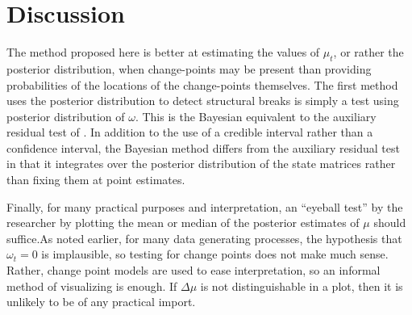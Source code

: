 \section{Discussion}
\label{dlm:sec:ident-change-points}

The method proposed here is better at estimating the values of $\mu_{t}$, or rather the posterior distribution, when change-points may be present than providing probabilities of the locations of the change-points themselves.
The first method uses the posterior distribution to detect structural breaks is simply a test using posterior distribution of $\omega$.
This is the Bayesian equivalent to the auxiliary residual test of \textcite{DeJongPenzer1998}.
In addition to the use of a credible interval rather than a confidence interval, the Bayesian method differs from the auxiliary residual test in that it integrates over the posterior distribution of the state matrices rather than fixing them at point estimates.




Finally, for many practical purposes and interpretation, an ``eyeball test'' by the researcher by plotting the mean or median of the posterior estimates of $\mu$ should suffice.As noted earlier, for many data generating processes, the hypothesis that $\omega_{t} = 0$ is implausible, so testing for change points does not make much sense.
Rather, change point models are used to ease interpretation, so an informal method of visualizing is enough.
If $\Delta \mu$ is not distinguishable in a plot, then it is unlikely to be of any practical import.

